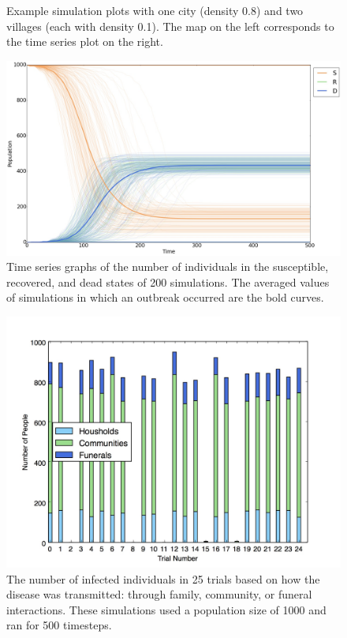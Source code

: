 \begin{figure}
\caption{Example simulation plots with one city (density 0.8) and two villages (each with density 0.1). The map on the left corresponds to the time series plot on the right.}\label{sabd:ex}
\end{figure}

\begin{figure}
  \centering
  \includegraphics[width=\textwidth]{av-time}
  \caption{Time series graphs of the number of individuals in the susceptible, recovered, and dead states of 200 simulations. The averaged values of simulations in which an outbreak occurred are the bold curves.}
  \label{fig:av-time}
\end{figure}

\begin{figure}
  \centering
  \includegraphics[width=.75\textwidth]{infecttypes}
  \caption{The number of infected individuals in 25 trials based on how the disease was transmitted: through family, community, or funeral interactions. These simulations used a population size of 1000 and ran for 500 timesteps.}
  \label{fig:infecttypes}
\end{figure}

